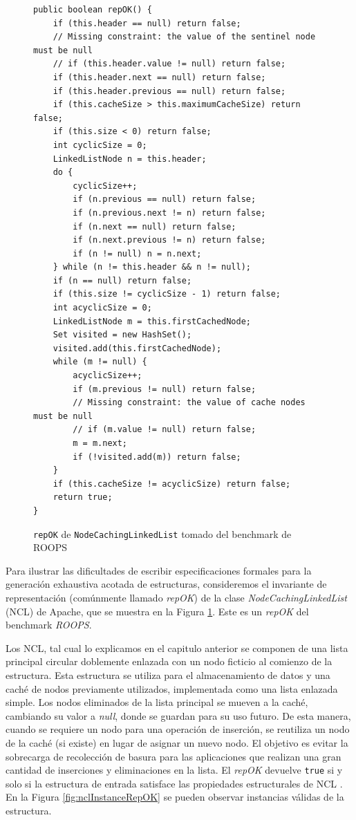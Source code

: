 \begin{figure}[!thb]
\begin{lstlisting}
public boolean repOK() {
    if (this.header == null) return false;
    // Missing constraint: the value of the sentinel node must be null  
    // if (this.header.value != null) return false;
    if (this.header.next == null) return false;
    if (this.header.previous == null) return false;
    if (this.cacheSize > this.maximumCacheSize) return false;
    if (this.size < 0) return false;
    int cyclicSize = 0;
    LinkedListNode n = this.header;
    do {
        cyclicSize++;
        if (n.previous == null) return false;
        if (n.previous.next != n) return false;
        if (n.next == null) return false;
        if (n.next.previous != n) return false;
        if (n != null) n = n.next;
    } while (n != this.header && n != null);
    if (n == null) return false;
    if (this.size != cyclicSize - 1) return false;
    int acyclicSize = 0;
    LinkedListNode m = this.firstCachedNode;
    Set visited = new HashSet();
    visited.add(this.firstCachedNode);
    while (m != null) {
        acyclicSize++;
        if (m.previous != null) return false;
        // Missing constraint: the value of cache nodes must be null
        // if (m.value != null) return false;
        m = m.next;
        if (!visited.add(m)) return false;
    }
    if (this.cacheSize != acyclicSize) return false;
    return true;
}
\end{lstlisting}
\caption{\texttt{repOK} de \texttt{NodeCachingLinkedList} tomado del benchmark de \textsf{ROOPS}}
\label{fig:NCL-repOK}
\end{figure}

Para ilustrar las dificultades de escribir especificaciones formales para la generación exhaustiva acotada de estructuras, 
consideremos el invariante de representación (comúnmente llamado \emph{repOK}) de la clase \emph{NodeCachingLinkedList} (NCL) de Apache, que se muestra en la Figura \ref{fig:NCL-repOK}.
Este es un \emph{repOK} del benchmark \emph{ROOPS}. 

Los NCL, tal cual lo explicamos en el capitulo anterior se componen de una lista principal circular doblemente enlazada con un nodo ficticio al comienzo de la estructura. 
Esta estructura se utiliza para el almacenamiento de datos y una caché de nodos previamente utilizados, 
implementada como una lista enlazada simple. Los nodos eliminados de la lista principal se mueven a la caché, 
cambiando su valor a \emph{null}, donde se guardan para su uso futuro. 
De esta manera, cuando se requiere un nodo para una operación de inserción, se reutiliza un nodo de la caché (si existe) 
en lugar de asignar un nuevo nodo. 
El objetivo es evitar la sobrecarga de recolección de basura para las aplicaciones que realizan una gran cantidad de inserciones y
eliminaciones en la lista. El \emph{repOK} devuelve \texttt{true} si y solo si la estructura de entrada satisface las propiedades estructurales de NCL \cite{Liskov00}. 
En la Figura \ref{fig:nclInstanceRepOK} se pueden observar instancias válidas de la estructura.

